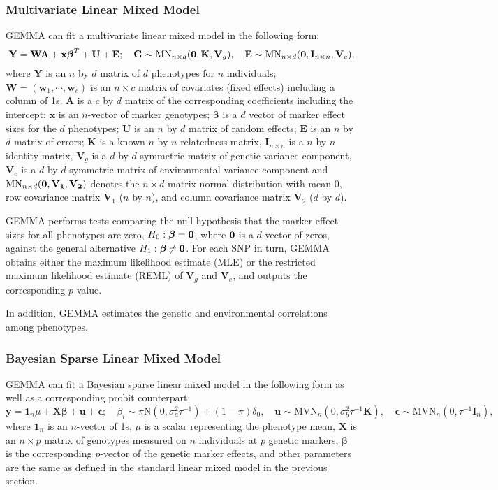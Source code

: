 \documentclass[11pt]{article}
\newcommand{\bx}{\mathbf{x}}
\newcommand{\bu}{\mathbf{u}}
\newcommand{\bw}{\mathbf{w}}
\newcommand{\bK}{\mathbf{K}}
\newcommand{\bV}{\mathbf{V}}
\newcommand{\bA}{\mathbf{A}}
\newcommand{\bX}{\mathbf{X}}
\newcommand{\bY}{\mathbf{Y}}
\newcommand{\bE}{\mathbf{E}}
\newcommand{\bG}{\mathbf{G}}
\newcommand{\bW}{\mathbf{W}}
\newcommand{\bU}{\mathbf{U}}
\newcommand{\bI}{\mathbf{I}}
\newcommand{\bepsilon}{\boldsymbol\epsilon}
\newcommand{\bbeta}{\boldsymbol\beta}
\begin{document}
\subsubsection{Multivariate Linear Mixed Model}
GEMMA can fit a multivariate linear mixed model in the following form:
%
\begin{equation*}
\bY=\bW \bA+\bx\bbeta^T+\bU+\bE;  \quad  \bG \sim \mbox{MN}_{n \times d}({\bf 0}, \bK, \bV_g), \quad \bE \sim \mbox{MN}_{n \times d}({\bf 0}, \bI_{n\times n}, \bV_e),
\end{equation*}
%
where $\bY$ is an $n$ by $d$ matrix of $d$ phenotypes for $n$ individuals; $\bW=(\bw_1, \cdots, \bw_c)$ is an $n\times c$ matrix of covariates (fixed effects) including a column of 1s; $\bA$ is a $c$ by $d$ matrix of the corresponding coefficients including the intercept; $\bx$ is an $n$-vector of marker genotypes; $\bbeta$ is a $d$ vector of marker effect sizes for the $d$ phenotypes; $\bU$ is an $n$ by $d$ matrix of random effects; $\bE$ is an $n$ by $d$ matrix of errors; $\bK$ is a known $n$ by $n$ relatedness matrix, $\bI_{n\times n}$ is a $n$ by $n$ identity matrix, $\bV_g$ is a $d$ by $d$  symmetric matrix of genetic variance component, $\bV_e$ is a $d$ by $d$  symmetric matrix of environmental variance component and $\mbox{MN}_{n \times d}(\bf{0}, \bV_1, \bV_2)$ denotes the $n \times d$ matrix normal distribution with mean 0, row covariance matrix $\bV_1$ ($n$ by $n$), and column covariance matrix $\bV_2$ ($d$ by $d$). 

GEMMA performs tests comparing the null hypothesis that the marker effect sizes for all phenotypes are zero, $H_0: \bbeta= \bf 0$, where $\bf 0$ is a $d$-vector of zeros, against the general alternative $H_1: \bbeta\neq \bf 0$. For each SNP in turn, GEMMA obtains either the maximum likelihood estimate (MLE) or the restricted maximum likelihood estimate (REML) of $\bV_g$ and $\bV_e$, and outputs the corresponding $p$ value.

In addition, GEMMA estimates the genetic and environmental correlations among phenotypes.


\subsubsection{Bayesian Sparse Linear Mixed Model}
GEMMA can fit a Bayesian sparse linear mixed model in the following form as well as a corresponding probit counterpart:
%
\begin{equation*}
\mathbf y=\mathbf 1_n\mu+\bX\bbeta+\bu+\bepsilon;   \quad \beta_i \sim \pi \mbox{N}(0, \sigma_a^2\tau^{-1})+(1-\pi)\delta_0, \quad \bu\sim \mbox{MVN}_n(0, \sigma_b^2 \tau^{-1} \bK), \quad \bepsilon \sim \mbox{MVN}_n(0, \tau^{-1} \bI_n),
\end{equation*}
%
where $\mathbf 1_n$ is an $n$-vector of 1s, $\mu$ is a scalar representing the phenotype mean, $\mathbf X$ is an $n \times p$ matrix of genotypes measured on $n$ individuals at $p$ genetic markers, $\bbeta$ is the corresponding $p$-vector of the genetic marker effects, and other parameters are the same as defined in the standard linear mixed model in the previous section.
\end{document}
